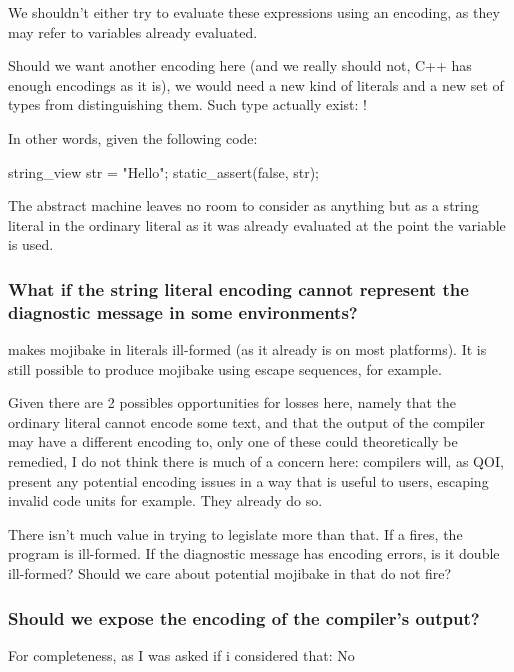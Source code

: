 \documentclass{wg21}
\begin{document}
We shouldn't either try to evaluate these expressions using an encoding, as they may refer to variables already evaluated.

Should we want another encoding here (and we really should not, C++ has enough encodings as it is), we would need a new kind of literals and a new set of types from distinguishing them. Such type actually exist: !

In other words, given the following code:

\begin{colorblock}
string_view str = "Hello";
static_assert(false, str);
\end{colorblock}

The abstract machine leaves no room to consider  as anything but as a string literal in the ordinary literal as
it was already evaluated at the point the variable is used.

\subsubsection{What if the string literal encoding cannot represent the diagnostic message in some environments?}

 makes mojibake in literals ill-formed (as it already is on most platforms). It is still possible to produce mojibake using
escape sequences, for example.

Given there are 2 possibles opportunities for losses here, namely that the ordinary literal cannot encode some text, and that the
output of the compiler may have a different encoding to, only one of these could theoretically be remedied, I do not think there is much of a concern here: compilers will, as QOI, present any potential encoding issues in a way that is useful to users, escaping invalid code units for example.
They already do so.

There isn't much value in trying to legislate more than that.
If a  fires, the program is ill-formed. If the diagnostic message has encoding errors, is it double ill-formed?
Should we care about potential mojibake in  that do not fire?

\subsubsection{Should we expose the encoding of the compiler's output?}

For completeness, as I was asked if i considered that: No
\end{document}
